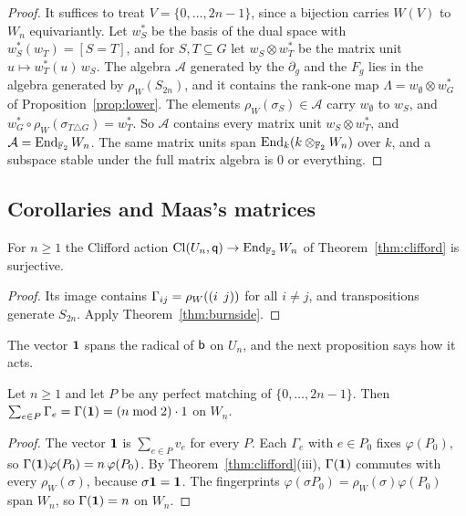 \begin{proof}
It suffices to treat $V=\{0,\dots,2n-1\}$, since a bijection carries $W(V)$ to $W_n$ equivariantly. Let $w_S^*$ be the basis of the dual space with $w_S^*(w_T)=[S=T]$, and for $S,T\subseteq G$ let $w_S\otimes w_T^*$ be the matrix unit $u\mapsto w_T^*(u)\,w_S$. The algebra $\mathcal A$ generated by the $\partial_g$ and the $F_g$ lies in the algebra generated by $\rho_W(S_{2n})$, and it contains the rank-one map $\Lambda=w_\emptyset\otimes w_G^*$ of Proposition~\ref{prop:lower}. The elements $\rho_W(\sigma_S)\in\mathcal A$ carry $w_\emptyset$ to $w_S$, and $w_G^*\circ\rho_W(\sigma_{T\triangle G})=w_T^*$. So $\mathcal A$ contains every matrix unit $w_S\otimes w_T^*$, and $\mathcal A=\operatorname{End}_{\mathbb{F}_2}W_n$. The same matrix units span $\operatorname{End}_k(k\otimes_{\mathbb{F}_2}W_n)$ over $k$, and a subspace stable under the full matrix algebra is $0$ or everything.
\end{proof}

\subsection{Corollaries and Maas's matrices}

\begin{corollary}\label{cor:clsurj}
For $n\ge1$ the Clifford action $\operatorname{Cl}(U_n,\mathsf{q})\to\operatorname{End}_{\mathbb{F}_2}W_n$ of Theorem~\ref{thm:clifford} is surjective.
\end{corollary}

\begin{proof}
Its image contains $\Gamma_{ij}=\rho_W((i\;\,j))$ for all $i\ne j$, and transpositions generate $S_{2n}$. Apply Theorem~\ref{thm:burnside}.
\end{proof}

The vector $\mathbf{1}$ spans the radical of $\mathsf{b}$ on $U_n$, and the next proposition says how it acts.

\begin{proposition}\label{prop:matchingsum}
Let $n\ge1$ and let $P$ be any perfect matching of $\{0,\dots,2n-1\}$. Then $\sum_{e\in P}\Gamma_e=\Gamma(\mathbf{1})=(n\bmod 2)\cdot1$ on $W_n$.
\end{proposition}

\begin{proof}
The vector $\mathbf{1}$ is $\sum_{e\in P}v_e$ for every $P$. Each $\Gamma_e$ with $e\in P_0$ fixes $\varphi(P_0)$, so $\Gamma(\mathbf{1})\varphi(P_0)=n\,\varphi(P_0)$. By Theorem~\ref{thm:clifford}(iii), $\Gamma(\mathbf{1})$ commutes with every $\rho_W(\sigma)$, because $\sigma\mathbf{1}=\mathbf{1}$. The fingerprints $\varphi(\sigma P_0)=\rho_W(\sigma)\varphi(P_0)$ span $W_n$, so $\Gamma(\mathbf{1})=n$ on $W_n$.
\end{proof}

